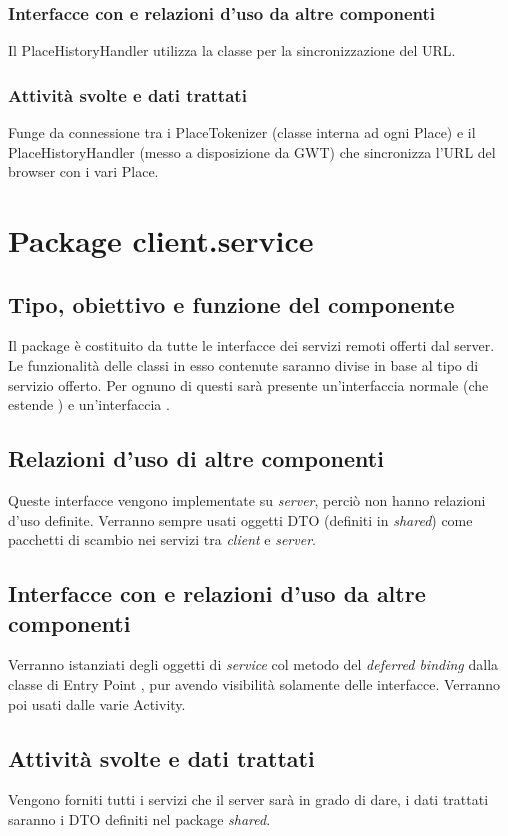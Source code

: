 \subsubsection*{Interfacce con e relazioni d'uso da altre componenti}
Il PlaceHistoryHandler utilizza la classe per la sincronizzazione del URL.
\subsubsection*{Attivit\`a svolte e dati trattati}
Funge da connessione tra i PlaceTokenizer (classe interna ad ogni Place) e il
PlaceHistoryHandler (messo a disposizione da GWT) che sincronizza l'URL del
browser con i vari Place.

\newpage
\section{Package client.service} %
\subsection*{Tipo, obiettivo e funzione del componente}
Il package  \`e costituito da tutte le interfacce dei servizi remoti
offerti dal server. Le funzionalit\`a delle classi in esso contenute saranno
divise in base al tipo di servizio offerto. Per ognuno di questi sar\`a
presente un'interfaccia normale (che estende ) e
un'interfaccia .

\subsection*{Relazioni d'uso di altre componenti}
Queste interfacce vengono implementate su \emph{server}, perci\`o non
hanno relazioni d'uso definite. Verranno sempre usati oggetti DTO (definiti in
\emph{shared}) come pacchetti di scambio nei servizi tra \emph{client} e
\emph{server}.

\subsection*{Interfacce con e relazioni d'uso da altre componenti}
Verranno istanziati degli oggetti di \emph{service} col metodo del
\emph{deferred binding} dalla classe di Entry Point , pur avendo
visibilit\`a solamente delle interfacce. Verranno poi usati dalle varie Activity.

\subsection*{Attivit\`a svolte e dati trattati}
Vengono forniti tutti i servizi che il server sar\`a in grado di dare, i dati
trattati saranno i DTO definiti nel package \emph{shared}.

